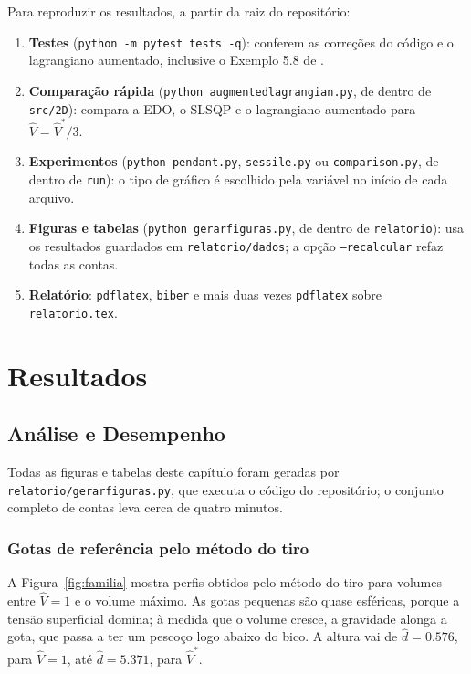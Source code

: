 \documentclass[12pt, oneside, a4paper, english, brazil]{abntex2}
\theoremstyle{relatorio}
\theoremstyle{relatorioit}
\theoremstyle{problema}
\newcommand{\code}[1]{{\renewcommand{\_}{\textunderscore\allowbreak}\texttt{#1}}}
\newcommand{\Vh}{\hat V}
\newcommand{\dhat}{\hat d}
\begin{document}
Para reproduzir os resultados, a partir da raiz do repositório:

\begin{enumerate}
  \item \textbf{Testes} (\code{python -m pytest tests -q}): conferem as correções do
    código e o lagrangiano aumentado, inclusive o Exemplo 5.8 de \textcite{martins2021}.
  \item \textbf{Comparação rápida} (\code{python augmented\_lagrangian.py}, de dentro
    de \code{src/2D}): compara a EDO, o SLSQP e o lagrangiano aumentado para
    $\Vh = \Vh^*/3$.
  \item \textbf{Experimentos} (\code{python pendant.py}, \code{sessile.py} ou
    \code{comparison.py}, de dentro de \code{run}): o tipo de gráfico é escolhido pela
    variável no início de cada arquivo.
  \item \textbf{Figuras e tabelas} (\code{python gerar\_figuras.py}, de dentro de
    \code{relatorio}): usa os resultados guardados em \code{relatorio/dados}; a opção
    \code{--recalcular} refaz todas as contas.
  \item \textbf{Relatório}: \code{pdflatex}, \code{biber} e mais duas vezes
    \code{pdflatex} sobre \code{relatorio.tex}.
\end{enumerate}

\chapter{Resultados}

\section{Análise e Desempenho}

Todas as figuras e tabelas deste capítulo foram geradas por
\code{relatorio/gerar\_figuras.py}, que executa o código do repositório; o conjunto
completo de contas leva cerca de quatro minutos.

\subsection{Gotas de referência pelo método do tiro}

A Figura~\ref{fig:familia} mostra perfis obtidos pelo método do tiro para volumes
entre $\Vh = 1$ e o volume máximo. As gotas pequenas são quase esféricas, porque a
tensão superficial domina; à medida que o volume cresce, a gravidade alonga a gota, que
passa a ter um pescoço logo abaixo do bico. A altura vai de $\dhat = \num{0.576}$, para
$\Vh = 1$, até $\dhat = \num{5.371}$, para $\Vh^*$.
\end{document}
